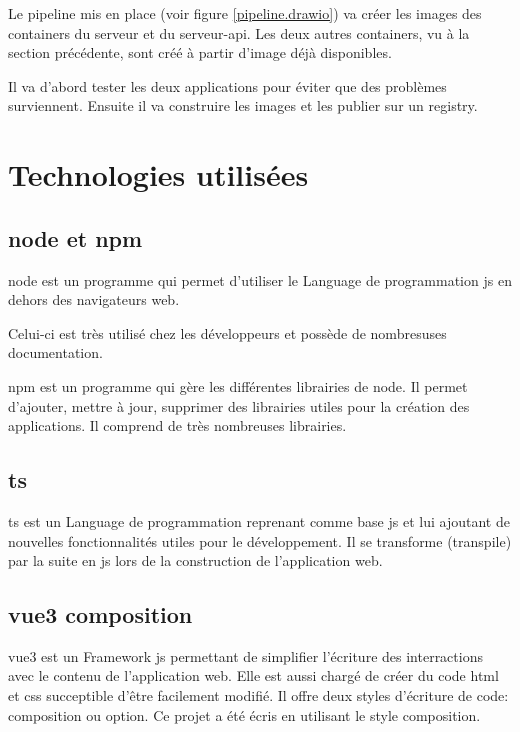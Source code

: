 \documentclass[
    iai, %
    il, %
]{heig-tb}
\begin{document}

Le pipeline mis en place (voir figure \ref{pipeline.drawio}) va créer les images des containers du serveur et du serveur-api.
Les deux autres containers, vu à la section précédente, sont créé à partir d'image déjà disponibles.

Il va d'abord tester les deux applications pour éviter que des problèmes surviennent.
Ensuite il va construire les images et les publier sur un registry.

\section{Technologies utilisées}

\subsection{\gls{node} et \gls{npm}}
\gls{node} est un programme qui permet d'utiliser le Language de programmation \gls{js} en dehors des navigateurs web.

Celui-ci est très utilisé chez les développeurs et possède de nombresuses documentation. 

\gls{npm} est un programme qui gère les différentes librairies de \gls{node}.
Il permet d'ajouter, mettre à jour, supprimer des librairies utiles pour la création des applications.
Il comprend de très nombreuses librairies.

\subsection{\gls{ts}}
\gls{ts} est un Language de programmation reprenant comme base \gls{js} et lui ajoutant de nouvelles fonctionnalités utiles pour le développement.
Il se transforme (transpile) par la suite en \gls{js} lors de la construction de l'application web.

\subsection{\gls{vue3} composition}
\gls{vue3} est un Framework \gls{js} permettant de simplifier l'écriture des interractions avec le contenu de l'application web.
Elle est aussi chargé de créer du code \gls{html} et \gls{css} succeptible d'être facilement modifié.
Il offre deux styles d'écriture de code: composition ou option.
Ce projet a été écris en utilisant le style composition.
\end{document}

